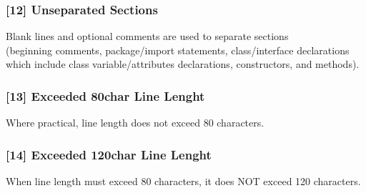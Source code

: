 \subsubsection{[12] Unseparated Sections}
Blank lines and optional comments are used to separate sections\\
(beginning comments, package/import statements, class/interface declarations which include class variable/attributes declarations, constructors, and methods).
\subsubsection{[13] Exceeded 80char Line Lenght}
Where practical, line length does not exceed 80 characters.
\subsubsection{[14] Exceeded 120char Line Lenght}
When line length must exceed 80 characters, it does NOT exceed 120 characters.